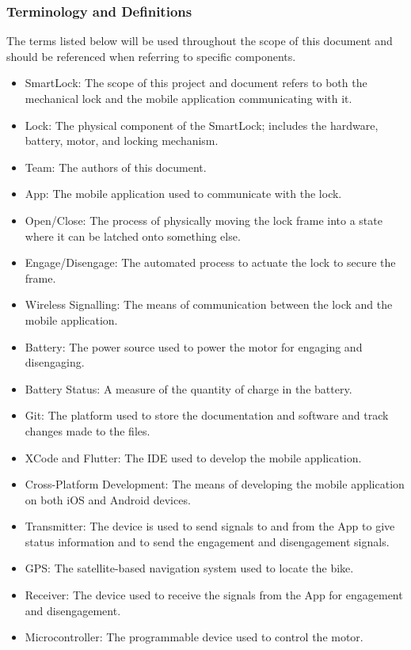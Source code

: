 \documentclass[12pt]{article}
\begin{document}
\subsubsection{Terminology and  Definitions}

The terms listed below will be used throughout the scope of this document and should be referenced when referring to specific components.  

\begin{itemize}
\item SmartLock: The scope of this project and document refers to both the mechanical lock and the mobile application communicating with it. 
\item Lock: The physical component of the SmartLock; includes the hardware, battery, motor, and locking mechanism.  
\item Team: The authors of this document.
\item App: The mobile application used to communicate with the lock.
\item Open/Close: The process of physically moving the lock frame into a state where it can be latched onto something else. 
\item Engage/Disengage: The automated process to actuate the lock to secure the frame. 
\item Wireless Signalling: The means of communication between the lock and the mobile application. 
\item Battery: The power source used to power the motor for engaging and disengaging. 
\item Battery Status: A measure of the quantity of charge in the battery. 
\item Git: The platform used to store the documentation and software and track changes made to the files. 
\item XCode and Flutter: The IDE used to develop the mobile application. 
\item Cross-Platform Development: The means of developing the mobile application on both iOS and Android devices. 
\item Transmitter: The device is used to send signals to and from the App to give status information and to send the engagement and disengagement signals. 
\item GPS: The satellite-based navigation system used to locate the bike. 
\item Receiver: The device used to receive the signals from the App for engagement and disengagement. 
\item Microcontroller: The programmable device used to control the motor. 
\end{itemize}
~\newpage
\end{document}
